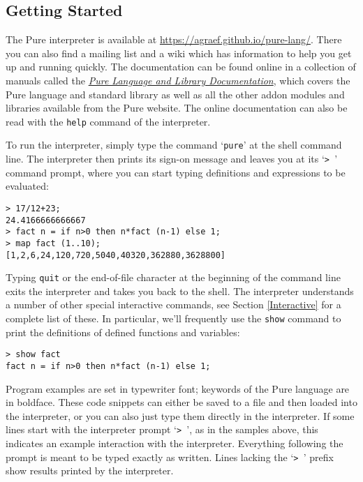 \documentclass[a4paper,12pt]{article}
\begin{document}
\subsection{Getting Started}

The Pure interpreter is available at \url{https://agraef.github.io/pure-lang/}. There you can also find a mailing list and a wiki which has information to help you get up and running quickly. The documentation can be found online in a collection of manuals called the \emph{\href{https://agraef.github.io/pure-docs/}{Pure Language and Library Documentation}}, which covers the Pure language and standard library as well as all the other addon modules and libraries available from the Pure website. The online documentation can also be read with the \verb|help| command of the interpreter.

To run the interpreter, simply type the command `\texttt{pure}' at the shell command line. The interpreter then prints its sign-on message and leaves you at its `\verb|> |' command prompt, where you can start typing definitions and expressions to be evaluated:

\begin{lstlisting}
> 17/12+23;
24.4166666666667
> fact n = if n>0 then n*fact (n-1) else 1;
> map fact (1..10);
[1,2,6,24,120,720,5040,40320,362880,3628800]
\end{lstlisting}

Typing \verb|quit| or the end-of-file character at the beginning of the command line exits the interpreter and takes you back to the shell. The interpreter understands a number of other special interactive commands, see Section \ref{Interactive} for a complete list of these. In particular, we'll frequently use the \verb|show| command to print the definitions of defined functions and variables:

\begin{lstlisting}
> show fact
fact n = if n>0 then n*fact (n-1) else 1;
\end{lstlisting}

Program examples are set in typewriter font; keywords of the Pure language are in boldface. These code snippets can either be saved to a file and then loaded into the interpreter, or you can also just type them directly in the interpreter. If some lines start with the interpreter prompt `\verb|> |', as in the samples above, this indicates an example interaction with the interpreter. Everything following the prompt is meant to be typed exactly as written. Lines lacking the `\verb|> |' prefix show results printed by the interpreter.
\end{document}
